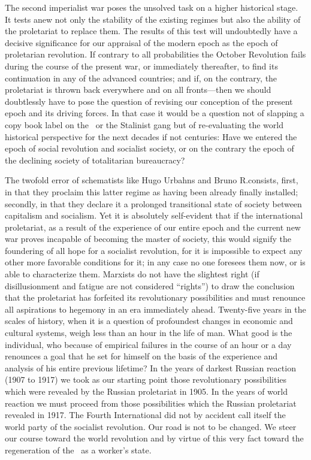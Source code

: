 The second imperialist war poses the unsolved task on a higher historical stage. It tests anew not only the stability of the existing regimes but also the ability of the proletariat to replace them. The results of this test will undoubtedly have a decisive significance for our appraisal of the modern epoch as the epoch of proletarian revolution. If contrary to all probabilities the October Revolution fails during the course of the present war, or immediately thereafter, to find its continuation in any of the advanced countries; and if, on the contrary, the proletariat is thrown back everywhere and on all fronts---then we should doubtlessly have to pose the question of revising our conception of the present epoch and its driving forces. In that case it would be a question not of slapping a copy book label on the \USSR\ or the Stalinist gang but of re-evaluating the world historical perspective for the next decades if not centuries: Have we entered the epoch of social revolution and socialist society, or on the contrary the epoch of the declining society of totalitarian bureaucracy?

The twofold error of schematists like Hugo Urbahns and Bruno R.\@ consists, first, in that they proclaim this latter regime as having been already finally installed; secondly, in that they declare it a prolonged transitional state of society between capitalism and socialism. Yet it is absolutely self-evident that if the international proletariat, as a result of the experience of our entire epoch and the current new war proves incapable of becoming the master of society, this would signify the foundering of all hope for a socialist revolution, for it is impossible to expect any other more favorable conditions for it; in any case no one foresees them now, or is able to characterize them. Marxists do not have the slightest right (if disillusionment and fatigue are not considered “rights”) to draw the conclusion that the proletariat has forfeited its revolutionary possibilities and must renounce all aspirations to hegemony in an era immediately ahead. Twenty-five years in the scales of history, when it is a question of profoundest changes in economic and cultural systems, weigh less than an hour in the life of man. What good is the individual, who because of empirical failures in the course of an hour or a day renounces a goal that he set for himself on the basis of the experience and analysis of his entire previous lifetime? In the years of darkest Russian reaction (1907 to 1917) we took as our starting point those revolutionary possibilities which were revealed by the Russian proletariat in 1905. In the years of world reaction we must proceed from those possibilities which the Russian proletariat revealed in 1917. The Fourth International did not by accident call itself the world party of the socialist revolution. Our road is not to be changed. We steer our course toward the world revolution and by virtue of this very fact toward the regeneration of the \USSR\ as a worker’s state.

